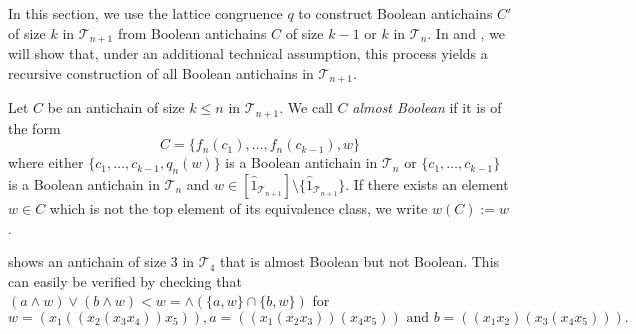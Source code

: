\documentclass{preprint}
\newcommand{\cT}{\mathcal{T}}
\theoremstyle{definition}
\begin{document}
In this section, we use the lattice congruence $q$ to construct Boolean antichains $C'$ of size $k$ in $\cT_{n+1}$ from Boolean antichains $C$ of size $k-1$ or $k$ in $\cT_n$. 
In  and , we will show that, under an additional technical assumption, this process yields a recursive construction of all Boolean antichains in $\cT_{n+1}$.

\begin{definition}\label{def: Almost Boolean}
    Let $C$ be an antichain of size $k\leq n$ in $\cT_{n+1}$. We call $C$ \textit{almost Boolean} if it is of the form \[C=\{f_n(c_1),\ldots,f_n(c_{k-1}),w\}\] where either $\{c_1,\ldots,c_{k-1},q_n(w)\}$ is a Boolean antichain in $\cT_n$ or $\{c_1,\ldots,c_{k-1}\}$ is a Boolean antichain in $\cT_n$ and $w \in  [\hat{1}_{\cT_{n+1}}]\setminus\{\hat{1}_{\cT_{n+1}}\}$.
    If there exists an element $w \in C$ which is not the top element of its equivalence class, we write $w(C):=w$.
\end{definition}


\begin{example}\label{ex: almost boolean}
     shows an antichain of size $3$ in $\cT_4$ that is almost Boolean but not Boolean. This can easily be verified by checking that $(a\wedge w)\vee(b\wedge w) < w = \wedge(\{a,w\}\cap \{b,w\})$ for
    $$w=(x_1((x_2(x_3x_4))x_5)), a = ((x_1(x_2x_3))(x_4x_5)) \text{ and } b = ((x_1x_2)(x_3(x_4x_5))).$$
\end{example}
\end{document}

